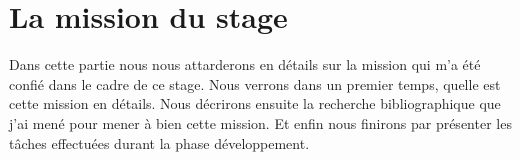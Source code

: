 \newpage
\section{La mission du stage}
Dans cette partie nous nous attarderons en détails sur la mission qui m'a été confié dans le cadre de ce stage. Nous verrons dans un premier temps, quelle est cette mission en détails. Nous décrirons ensuite la recherche bibliographique que j'ai mené pour mener à bien cette mission. Et enfin nous finirons par présenter les tâches effectuées durant la phase développement.



